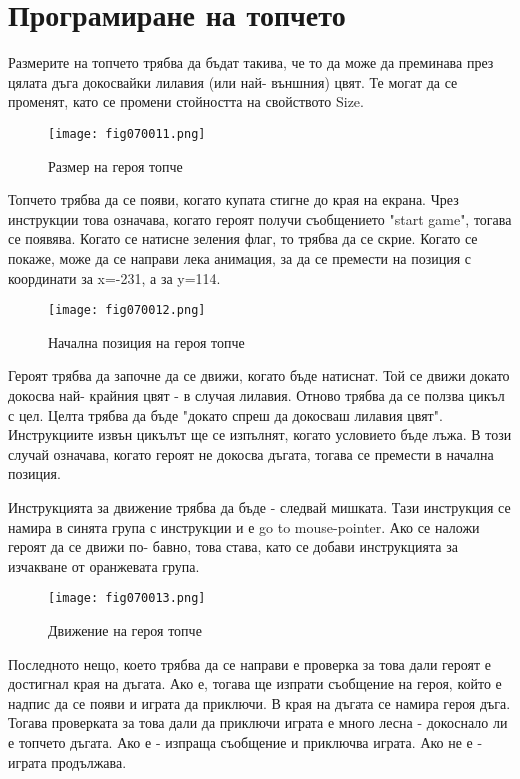 \section{Програмиране на топчето}
Размерите на топчето трябва да бъдат такива, че то да може да преминава през цялата дъга докосвайки лилавия (или най- външния) цвят. Те могат да се променят, като се промени стойността на свойството Size.

\begin{figure}[H]
  \centering
  \texttt{[image: fig070011.png]}
  \caption{Размер на героя топче}
\label{fig070011}
\end{figure}

Топчето трябва да се появи, когато купата стигне до края на екрана. Чрез инструкции това означава, когато героят получи съобщението "start game", тогава се появява. Когато се натисне зеления флаг, то трябва да се скрие. Когато се покаже, може да се направи лека анимация, за да се премести на позиция с координати за x=-231, а за y=114.

\begin{figure}[H]
  \centering
  \texttt{[image: fig070012.png]}
  \caption{Начална позиция на героя топче}
\label{fig070012}
\end{figure}

Героят трябва да започне да се движи, когато бъде натиснат. Той се движи докато докосва най- крайния цвят - в случая лилавия. Отново трябва да се ползва цикъл с цел. Целта трябва да бъде "докато спреш да докосваш лилавия цвят". Инструкциите извън цикълът ще се изпълнят, когато условието бъде лъжа. В този случай означава, когато героят не докосва дъгата, тогава се премести в начална позиция.

Инструкцията за движение трябва да бъде - следвай мишката. Тази инструкция се намира в синята група с инструкции и е go to mouse-pointer. Ако се наложи героят да се движи по- бавно, това става, като се добави инструкцията за изчакване от оранжевата група.

\begin{figure}[H]
  \centering
  \texttt{[image: fig070013.png]}
  \caption{Движение на героя топче}
\label{fig070013}
\end{figure}

Последното нещо, което трябва да се направи е проверка за това дали героят е достигнал края на дъгата. Ако е, тогава ще изпрати съобщение на героя, който е надпис да се появи и играта да приключи. В края на дъгата се намира героя дъга. Тогава проверката за това дали да приключи играта е много лесна - докоснало ли е топчето дъгата. Ако е - изпраща съобщение и приключва играта. Ако не е - играта продължава.

